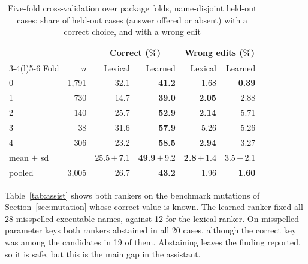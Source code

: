 \documentclass[conference]{IEEEtran}
\begin{document}
\begin{table}[t]
\centering
\caption{Five-fold cross-validation over package folds, name-disjoint held-out cases: share of
held-out cases (answer offered or absent) with a correct choice, and with a wrong edit}
\label{tab:assistcv}
\footnotesize
\begin{tabular}{@{}lrrrrr@{}}
\toprule
 & & \multicolumn{2}{c}{Correct (\%)} & \multicolumn{2}{c}{Wrong edits (\%)}\\
\cmidrule(lr){3-4}\cmidrule(l){5-6}
Fold & $n$ & Lexical & Learned & Lexical & Learned\\
\midrule
0 & 1{,}791 & 32.1 & \textbf{41.2} & 1.68 & \textbf{0.39}\\
1 &     730 & 14.7 & \textbf{39.0} & \textbf{2.05} & 2.88\\
2 &     140 & 25.7 & \textbf{52.9} & \textbf{2.14} & 5.71\\
3 &      38 & 31.6 & \textbf{57.9} & 5.26 & 5.26\\
4 &     306 & 23.2 & \textbf{58.5} & \textbf{2.94} & 3.27\\
\midrule
mean $\pm$ sd & & 25.5\,$\pm$\,7.1 & \textbf{49.9}\,$\pm$\,9.2 & \textbf{2.8}\,$\pm$\,1.4 & 3.5\,$\pm$\,2.1\\
pooled & 3{,}005 & 26.7 & \textbf{43.2} & 1.96 & \textbf{1.60}\\
\bottomrule
\end{tabular}
\end{table}

Table~\ref{tab:assist} shows both rankers on the benchmark mutations of
Section~\ref{sec:mutation} whose correct value is known. The learned ranker fixed all 28
misspelled executable names, against 12 for the lexical ranker. On misspelled parameter keys both
rankers abstained in all 20 cases, although the correct key was among the candidates in 19 of
them. Abstaining leaves the finding reported, so it is safe, but this is the main gap in the
assistant.

\begin{table}[t]
\centering
\caption{Repair choices on benchmark mutations (correct / abstained / wrong)}
\label{tab:assist}
\footnotesize
{}
\end{table}
\end{document}
